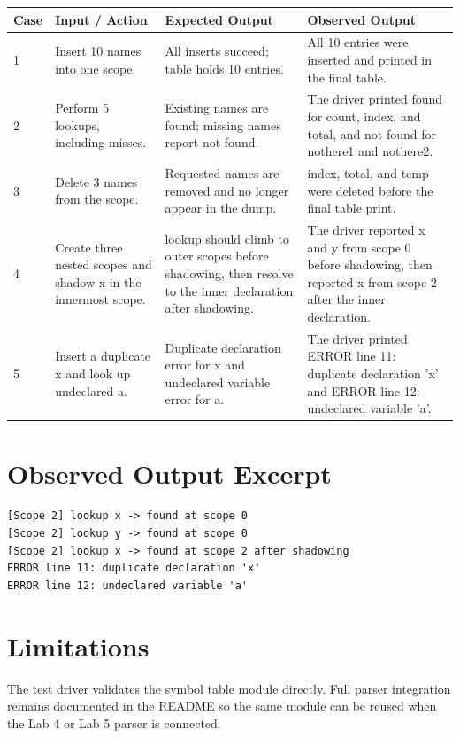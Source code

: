 \documentclass[11pt]{article}
\begin{document}
\begin{longtable}{|p{}|p{}|p{}|p{}|}
\hline
\textbf{Case} & \textbf{Input / Action} & \textbf{Expected Output} & \textbf{Observed Output} \\
\hline
1 & Insert 10 names into one scope. & All inserts succeed; table holds 10 entries. & All 10 entries were inserted and printed in the final table. \\
\hline
2 & Perform 5 lookups, including misses. & Existing names are found; missing names report not found. & The driver printed found for count, index, and total, and not found for nothere1 and nothere2. \\
\hline
3 & Delete 3 names from the scope. & Requested names are removed and no longer appear in the dump. & index, total, and temp were deleted before the final table print. \\
\hline
4 & Create three nested scopes and shadow x in the innermost scope. & lookup should climb to outer scopes before shadowing, then resolve to the inner declaration after shadowing. & The driver reported x and y from scope 0 before shadowing, then reported x from scope 2 after the inner declaration. \\
\hline
5 & Insert a duplicate x and look up undeclared a. & Duplicate declaration error for x and undeclared variable error for a. & The driver printed ERROR line 11: duplicate declaration 'x' and ERROR line 12: undeclared variable 'a'. \\
\hline
\end{longtable}

\section{Observed Output Excerpt}
\begin{verbatim}
[Scope 2] lookup x -> found at scope 0
[Scope 2] lookup y -> found at scope 0
[Scope 2] lookup x -> found at scope 2 after shadowing
ERROR line 11: duplicate declaration 'x'
ERROR line 12: undeclared variable 'a'
\end{verbatim}

\section{Limitations}
The test driver validates the symbol table module directly. Full parser integration remains documented in the README so the same module can be reused when the Lab 4 or Lab 5 parser is connected.
\end{document}

